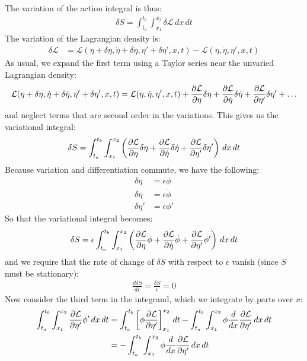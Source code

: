 The variation of the action integral is thus:
\begin{align}
\delta S=\int_{t_a}^{t_b} \int_{x_1}^{x_2}\delta\mathcal{L}\,dx\,dt
\end{align}
The variation of the Lagrangian density is:
\begin{align}
\delta\mathcal{L}&=\mathcal{L}(\eta+\delta\eta,\dot\eta+\delta\dot\eta,\eta'+\delta\eta',x,t)-\mathcal{L}(\eta,\dot\eta,\eta',x,t)\nonumber
\end{align}
As usual, we expand the first term using a Taylor series near the unvaried Lagrangian density:
\begin{align}
\mathcal{L}(\eta+\delta\eta,\dot\eta+\delta\dot\eta,\eta'+\delta\eta',x,t)=\mathcal{L}(\eta,\dot\eta,\eta',x,t)+\frac{\partial \mathcal{L}}{\partial \eta}\delta\eta+\frac{\partial \mathcal{L}}{\partial \dot\eta}\delta\dot\eta+\frac{\partial \mathcal{L}}{\partial \eta'}\delta\eta'+\dots
\end{align}
and neglect terms that are second order in the variations. This gives us the variational integral:
\begin{align}
\delta S=\int_{t_a}^{t_b} \int_{x_1}^{x_2} \left(\frac{\partial \mathcal{L}}{\partial \eta}\delta\eta+\frac{\partial \mathcal{L}}{\partial \dot\eta}\delta\dot\eta+\frac{\partial \mathcal{L}}{\partial \eta'}\delta\eta'  \right)\,dx\,dt
\end{align}
Because variation and differentiation commute, we have the following:
\begin{align}
\delta \eta &=\epsilon \phi\nonumber\\
\delta \dot\eta &=\epsilon\dot\phi\nonumber\\
\delta \eta' &=\epsilon \phi'
\end{align}
So that the variational integral becomes:
\begin{align}
\delta S=\epsilon\int_{t_a}^{t_b} \int_{x_1}^{x_2} \left(\frac{\partial \mathcal{L}}{\partial \eta}\phi+\frac{\partial \mathcal{L}}{\partial \dot\eta}\dot\phi+\frac{\partial \mathcal{L}}{\partial \eta'}\phi'  \right)\,dx\,dt
\end{align}
and we require that the rate of change of $\delta S$ with respect to $\epsilon$ vanish (since $S$ must be stationary):
\begin{align}
\frac{d\delta S}{d\epsilon}=\frac{\delta S}{\epsilon}=0
\end{align}
Now consider the third term in the integrand, which we integrate by parts over $x$:
\begin{align}
\int_{t_a}^{t_b} \int_{x_1}^{x_2}\frac{\partial \mathcal{L}}{\partial \eta'}\phi' \,dx\,dt&=\int_{t_a}^{t_b}\left[\phi\frac{\partial \mathcal{L}}{\partial \eta'}\right]_{x_1}^{x_2}\,dt-\int_{t_a}^{t_b} \int_{x_1}^{x_2}\phi\frac{d}{dx}\frac{\partial \mathcal{L}}{\partial \eta'}\,dx\,dt\nonumber\\
&=-\int_{t_a}^{t_b} \int_{x_1}^{x_2}\phi\frac{d}{dx}\frac{\partial \mathcal{L}}{\partial \eta'}\,dx\,dt
\end{align}
